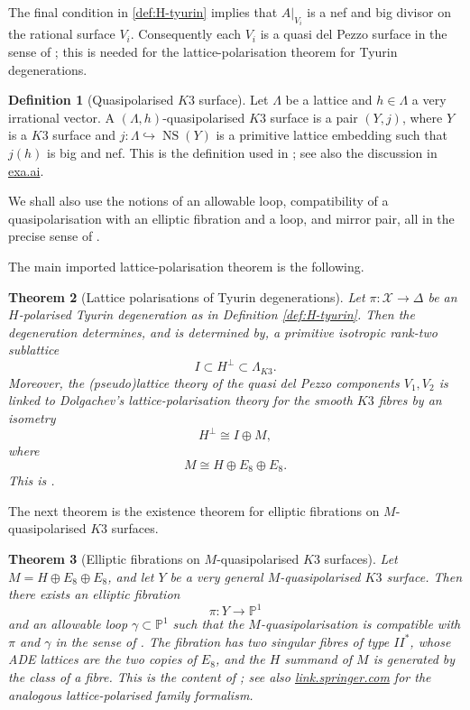 \documentclass[11pt]{amsart}
\newtheorem{theorem}{Theorem}[section]
\theoremstyle{definition}
\newtheorem{definition}[theorem]{Definition}
\theoremstyle{remark}
\begin{document}
The final condition in \eqref{def:H-tyurin} implies that \(A|_{V_i}\) is a nef
and big divisor on the rational surface \(V_i\).  Consequently each \(V_i\) is a
quasi del Pezzo surface in the sense of \cite[DT18, HT20]{GT24}; this is needed
for the lattice-polarisation theorem for Tyurin degenerations.

\begin{definition}[Quasipolarised \(K3\) surface]
\label{def:quasipolarised}
Let \(\Lambda\) be a lattice and \(h\in \Lambda\) a very irrational vector.
A \((\Lambda,h)\)-quasipolarised \(K3\) surface is a pair \((Y,j)\), where
\(Y\) is a \(K3\) surface and \(j\colon \Lambda\hookrightarrow \operatorname{NS}(Y)\)
is a primitive lattice embedding such that \(j(h)\) is big and nef.  This is the
definition used in \cite[Definition 4.2]{GT24}; see also the discussion in
\href{https://exa.ai/library/publication/xr8dkyl88dy}{exa.ai}.
\end{definition}

We shall also use the notions of an allowable loop, compatibility of a
quasipolarisation with an elliptic fibration and a loop, and mirror pair, all in
the precise sense of \cite[Definitions 4.11, 4.21, 5.1]{GT24}.

The main imported lattice-polarisation theorem is the following.

\begin{theorem}[Lattice polarisations of Tyurin degenerations]
\label{thm:lattice-tyurin}
Let \(\pi\colon \mathcal X\to \Delta\) be an \(H\)-polarised Tyurin degeneration
as in Definition \ref{def:H-tyurin}.  Then the degeneration determines, and is
determined by, a primitive isotropic rank-two sublattice
\[
I\subset H^\perp\subset \Lambda_{K3}.
\]
Moreover, the (pseudo)lattice theory of the quasi del Pezzo components
\(V_1,V_2\) is linked to Dolgachev's lattice-polarisation theory for the smooth
\(K3\) fibres by an isometry
\[
H^\perp \cong I\oplus M,
\]
where
\[
M\cong H\oplus E_8\oplus E_8.
\]
This is \cite[Theorems 3.26 and 3.28]{GT24}.
\end{theorem}

The next theorem is the existence theorem for elliptic fibrations on
\(M\)-quasipolarised \(K3\) surfaces.

\begin{theorem}[Elliptic fibrations on \(M\)-quasipolarised \(K3\) surfaces]
\label{thm:elliptic-fibration}
Let \(M=H\oplus E_8\oplus E_8\), and let \(Y\) be a very general
\(M\)-quasipolarised \(K3\) surface.  Then there exists an elliptic fibration
\[
\pi\colon Y\to \mathbb P^1
\]
and an allowable loop \(\gamma\subset \mathbb P^1\) such that the
\(M\)-quasipolarisation is compatible with \(\pi\) and \(\gamma\) in the sense of
\cite[Definition 4.21]{GT24}.  The fibration has two singular fibres of type
\(II^*\), whose ADE lattices are the two copies of \(E_8\), and the \(H\)
summand of \(M\) is generated by the class of a fibre.  This is the content of
\cite[Section 4]{GT24}; see also
\href{https://link.springer.com/article/10.1007/s00209-019-02279-9}{link.springer.com}
for the analogous lattice-polarised family formalism.
\end{theorem}
\end{document}

